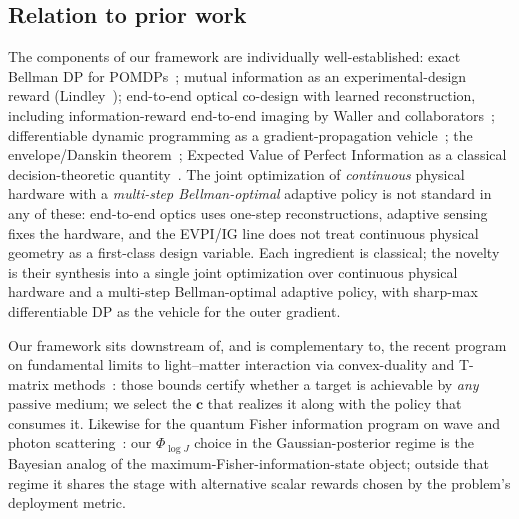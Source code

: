 \documentclass[11pt,a4paper,onecolumn]{article}
\newcommand{\bc}{\bm{c}}
\begin{document}
\subsection{Relation to prior work}

The components of our framework are individually well-established: exact Bellman DP for POMDPs~\cite{bellman1957dynamic, sondik1971optimal, smallwood1973sondik}; mutual information as an experimental-design reward (Lindley~\cite{lindley1956measure}); end-to-end optical co-design with learned reconstruction, including information-reward end-to-end imaging by Waller and collaborators~\cite{kellman2019physics, muthumbi2019learned, bostan2018deep, kellman2020datadriven}; differentiable dynamic programming as a gradient-propagation vehicle~\cite{mensch2018differentiable, amos2018mpc, domke2012generic, blondel2022efficient}; the envelope/Danskin theorem~\cite{milgrom2002envelope, danskin1966theory, benveniste1979differentiability}; Expected Value of Perfect Information as a classical decision-theoretic quantity~\cite{howard1966decision, raiffa1961applied}.  The joint optimization of \emph{continuous} physical hardware with a \emph{multi-step Bellman-optimal} adaptive policy is not standard in any of these: end-to-end optics uses one-step reconstructions, adaptive sensing fixes the hardware, and the EVPI/IG line does not treat continuous physical geometry as a first-class design variable.  Each ingredient is classical; the novelty is their synthesis into a single joint optimization over continuous physical hardware and a multi-step Bellman-optimal adaptive policy, with sharp-max differentiable DP as the vehicle for the outer gradient.

Our framework sits downstream of, and is complementary to, the recent program on fundamental limits to light--matter interaction via convex-duality and T-matrix methods~\cite{miller2016fundamental, miller2023bounds, chao2022maximum, molesky2020tmatrix, molesky2020hierarchical, molesky2020bounds, kuang2020maximal, strekalov2022bounds, gustafsson2020upper, schab2020bounds, strekalov2020bounds, molesky2019global, venkataram2020fundamental, jelinek2021upper}: those bounds certify whether a target is achievable by \emph{any} passive medium; we select the $\bc$ that realizes it along with the policy that consumes it.  Likewise for the quantum Fisher information program on wave and photon scattering~\cite{rotter2017light, bouchet2021maximum, carrington2020fisher, defienne2021coincidence, tsang2016quantum, tsang2017ziv, tsang2019resolving}: our $\Phi_{\log J}$ choice in the Gaussian-posterior regime is the Bayesian analog of the maximum-Fisher-information-state object; outside that regime it shares the stage with alternative scalar rewards chosen by the problem's deployment metric.
\end{document}
